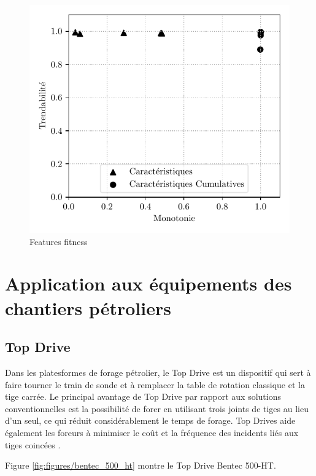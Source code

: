 \begin{figure}[H]
	\centering
	\includegraphics{figures/featuresfitness_fr.pdf}
	\caption{Features fitness}%
	\label{fig:features_fitness}
\end{figure}

\section{Application aux équipements des chantiers pétroliers}%
\label{sec:application_to_oilfield_equipment}

\subsection{Top Drive}%
\label{sub:top_drive}

Dans les platesformes de forage pétrolier, le Top Drive est un dispositif qui sert à faire tourner le train de sonde et à remplacer la table de rotation classique et la tige carrée. Le principal avantage de Top Drive par rapport aux solutions conventionnelles est la possibilité de forer en utilisant trois joints de tiges au lieu d'un seul, ce qui réduit considérablement le temps de forage. Top Drives aide également les foreurs à minimiser le coût et la fréquence des incidents liés aux tiges coincées \cite{slbtopdrive}.

Figure \ref{fig:figures/bentec_500_ht} montre le Top Drive Bentec 500-HT.

